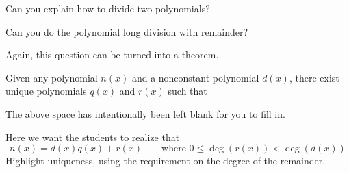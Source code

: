 \begin{question} 
Can you explain how to divide two polynomials? 
\end{question}
\QM

\begin{question} 
Can you do the polynomial long division with remainder?
\end{question}
\QM

Again, this question can be turned into a theorem.

\begin{theorem}
Given any polynomial $n(x)$ and a nonconstant polynomial $d(x)$, there exist unique
polynomials $q(x)$ and $r(x)$ such that
\vspace{1in}
\end{theorem}
\noindent The above space has intentionally been left blank for you to
fill in.
\begin{teachingnote}
Here we want the students to realize that
\[
n(x) = d(x)q(x) + r(x)\qquad\text{where } 0 \le \deg(r(x)) < \deg(d(x)) 
\]
Highlight uniqueness, using the requirement on the degree of the remainder.
\end{teachingnote}

